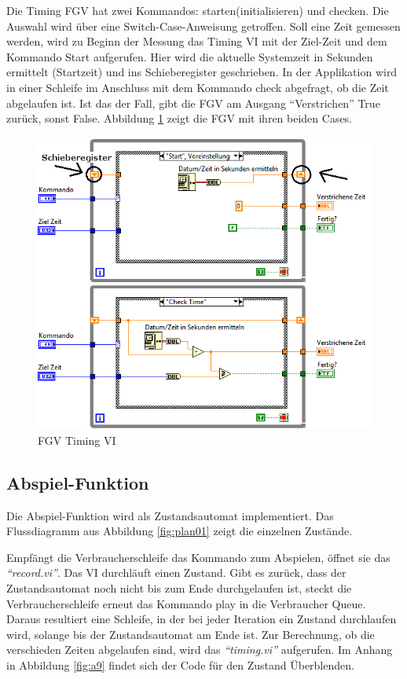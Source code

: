 Die Timing FGV hat zwei Kommandos: starten(initialisieren) und checken. 
Die Auswahl wird über eine Switch-Case-Anweisung getroffen. Soll eine Zeit gemessen werden, 
wird zu Beginn der Messung das Timing VI mit der Ziel-Zeit und dem Kommando Start aufgerufen. 
Hier wird die aktuelle Systemzeit in Sekunden ermittelt (Startzeit) und ins Schieberegister geschrieben. 
In der Applikation wird in einer Schleife im Anschluss mit dem Kommando check abgefragt, ob die Zeit abgelaufen ist. 
Ist das der Fall, gibt die FGV am Ausgang "`Verstrichen"' True zurück, sonst False. 
Abbildung \ref{fig:timing} zeigt die FGV mit ihren beiden Cases. 

	\begin{figure}[h!]
	\centering
		\includegraphics[width=\textwidth]{Pics/timing.png}
	\caption{FGV Timing VI}
	\label{fig:timing}
	\end{figure}


\subsection{Abspiel-Funktion}
Die Abspiel-Funktion wird als Zustandsautomat implementiert. Das Flussdiagramm aus Abbildung \ref{fig:plan01} zeigt die einzelnen Zustände. 

Empfängt die Verbraucherschleife das Kommando zum Abspielen, öffnet sie das \textit{"`record.vi"'}. Das VI durchläuft einen Zustand. 
Gibt es zurück, dass der Zustandsautomat noch nicht bis zum Ende durchgelaufen ist, steckt die Verbraucherschleife erneut das Kommando play in die Verbraucher Queue. 
Daraus resultiert eine Schleife, in der bei jeder Iteration ein Zustand durchlaufen wird, solange bis der Zustandsautomat am Ende ist.
Zur Berechnung, ob die verschieden Zeiten abgelaufen sind, wird das  \textit{"`timing.vi"'} aufgerufen. 
Im Anhang in Abbildung \ref{fig:a9} findet sich der Code für den Zustand Überblenden.

